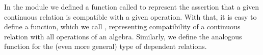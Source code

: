 In the  module we defined a function called  to represent the assertion that a given continuous relation is compatible with a given operation. With that, it is easy to define a function, which we call , representing compatibility of a continuous relation with all operations of an algebra. Similarly, we define the analogous  function for the (even more general)
type of dependent relations.
\ccpad
\begin{code}%
\>[1]\AgdaSpace{}%
\AgdaSymbol{:}\AgdaSpace{}%
\AgdaSymbol{\{}\AgdaSpace{}%
\AgdaSymbol{:}\AgdaSpace{}%
\AgdaSpace{}%
\AgdaSymbol{\}(}\AgdaSpace{}%
\AgdaSymbol{:}\AgdaSpace{}%
\AgdaSpace{}%
\AgdaSpace{}%
\AgdaSymbol{)}\AgdaSpace{}%
\AgdaSpace{}%
\AgdaSpace{}%
\AgdaSpace{}%
\AgdaSpace{}%
\AgdaSpace{}%
\AgdaSpace{}%
\AgdaSpace{}%
\AgdaSpace{}%
\AgdaSpace{}%
\AgdaSpace{}%
\AgdaSpace{}%
\AgdaSpace{}%
\AgdaSpace{}%
\AgdaSpace{}%
\AgdaSpace{}%
\<%
\\
%
\>[1]\AgdaSpace{}%

\end{code}
